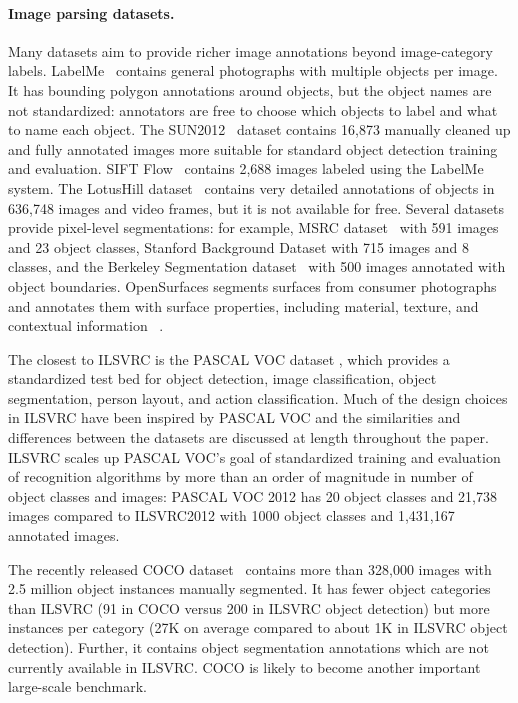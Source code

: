 \paragraph{Image parsing datasets.} Many datasets aim to provide richer image annotations beyond image-category labels. LabelMe~\citep{LabelMe}  contains general photographs with multiple objects per image. It has bounding polygon annotations around objects, but the object names are not standardized: annotators are free to choose which objects to label and what to name each object. The SUN2012~\citep{SUN} dataset contains 16,873 manually cleaned up and fully annotated images more suitable for standard object detection training and evaluation. SIFT Flow~\citep{Liu11} contains 2,688 images labeled using the LabelMe system. The LotusHill dataset~\citep{LotusHill} contains very detailed annotations of objects in 636,748 images and video frames, but it is not available for free.  Several datasets provide pixel-level segmentations: for example, MSRC dataset~\citep{MSRC} with 591 images and 23 object classes, Stanford Background Dataset \citep{Gould09} with 715 images and 8 classes, and the Berkeley Segmentation dataset~\citep{Arbelaez11} with 500 images annotated with object boundaries. OpenSurfaces segments surfaces from consumer photographs and annotates them with surface properties, including material, texture, and contextual information~\citep{Bell13} . 




The closest to ILSVRC is the PASCAL VOC dataset \citep{PASCALIJCV,PASCALIJCV2}, which provides a standardized test bed for object detection, image classification, object segmentation, person layout, and action classification. Much of the design choices in ILSVRC have been inspired by PASCAL VOC and the similarities and differences between the datasets are discussed at length throughout the paper. 
ILSVRC scales up  PASCAL VOC's goal of standardized training and evaluation of recognition algorithms by more than an order of magnitude in number
of object classes and images: PASCAL VOC 2012 has 20 object classes and 21,738 images compared to ILSVRC2012 with 1000 object classes and 1,431,167 annotated images.


The recently released COCO dataset~\citep{COCO} contains more than 328,000 images with 2.5 million object instances manually segmented. It has fewer object categories than ILSVRC (91 in COCO versus 200 in ILSVRC object detection) but more instances per category (27K on average compared to about 1K in ILSVRC object detection). Further, it contains object segmentation annotations which are not currently available in ILSVRC. COCO is likely to become another important large-scale benchmark.

